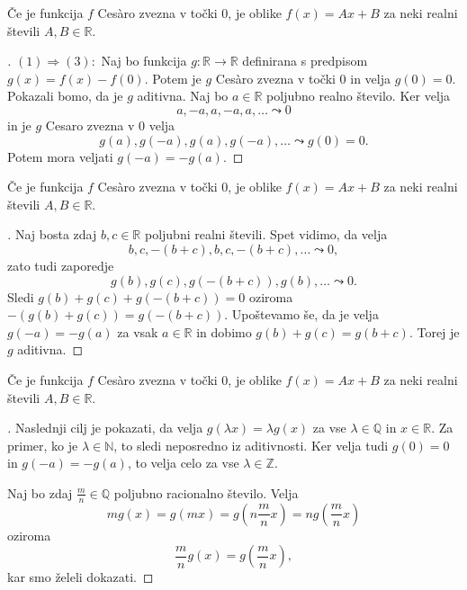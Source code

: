 \documentclass[10pt,hyperref={unicode}]{beamer}
\newenvironment{dokaz}{\begin{proof}[\bfseries\upshape\proofname]}{\end{proof}}
\begin{document}
\begin{frame}
    \begin{block}{}
        Če je funkcija $f$ Ces\`{a}ro zvezna v točki $0$, je oblike $f(x) = Ax + B$ za neki realni števili $A, B \in \mathbb{R}$.
    \end{block}
    \begin{dokaz}\renewcommand{\qedsymbol}{}
        $(1) \Rightarrow (3): $ Naj bo funkcija $g: \mathbb{R} \rightarrow \mathbb{R}$ definirana s predpisom $g(x) = f(x) - f(0)$. Potem je $g$ Ces\`{a}ro zvezna v točki $0$ in velja $g(0) = 0$. Pokazali bomo, da je $g$ aditivna.
        \pause
        Naj bo $a \in \mathbb{R}$ poljubno realno število. Ker velja $$a, -a, a, -a, a, \ldots \leadsto 0$$ in je $g$ Cesaro zvezna v $0$ velja $$g(a), g(-a), g(a), g(-a), \ldots \leadsto g(0) = 0.$$ 
        \pause 
        Potem mora veljati $g(-a) = -g(a)$. 
    \end{dokaz}
\end{frame}

\begin{frame}
    \begin{block}{}
        Če je funkcija $f$ Ces\`{a}ro zvezna v točki $0$, je oblike $f(x) = Ax + B$ za neki realni števili $A, B \in \mathbb{R}$.
    \end{block}
    \begin{dokaz}\renewcommand{\qedsymbol}{}
        Naj bosta zdaj $b, c \in \mathbb{R}$ poljubni realni števili. Spet vidimo, da velja 
        $$b, c, -(b+c), b, c, -(b+c), \ldots \leadsto 0,$$ zato tudi zaporedje $$g(b), g(c), g(-(b+c)), g(b), \ldots \leadsto 0.$$
        \pause
        Sledi $g(b) + g(c) + g(-(b+c)) = 0$ oziroma $-(g(b) + g(c)) = g(-(b+c))$. 
        \pause 
        Upoštevamo še, da je velja $g(-a) = -g(a)$ za vsak $a \in \mathbb{R}$ in dobimo $g(b) + g(c) = g(b+c)$. Torej je $g$ aditivna.
    \end{dokaz}
\end{frame}

\begin{frame}
    \begin{block}{}
        Če je funkcija $f$ Ces\`{a}ro zvezna v točki $0$, je oblike $f(x) = Ax + B$ za neki realni števili $A, B \in \mathbb{R}$.
    \end{block}
    \begin{dokaz}\renewcommand{\qedsymbol}{}
        Naslednji cilj je pokazati, da velja $g(\lambda x) = \lambda g(x)$ za vse $\lambda \in \mathbb{Q}$ in $x \in \mathbb{R}$. Za primer, ko je $\lambda \in \mathbb{N}$, to sledi neposredno iz aditivnosti. Ker velja tudi $g(0) = 0$ in $g(-a) = -g(a)$, to velja celo za vse $\lambda \in \mathbb{Z}$. 
        \pause

        Naj bo zdaj $\frac{m}{n} \in \mathbb{Q}$ poljubno racionalno število. Velja 
        $$mg(x) = g(mx) = g\left( n\frac{m}{n}x \right) = ng\left(\frac{m}{n}x\right)$$ 
        oziroma 
        $$\frac{m}{n}g(x) = g \left(\frac{m}{n}x \right),$$ 
        kar smo želeli dokazati.
    \end{dokaz}
\end{frame}
\end{document}
